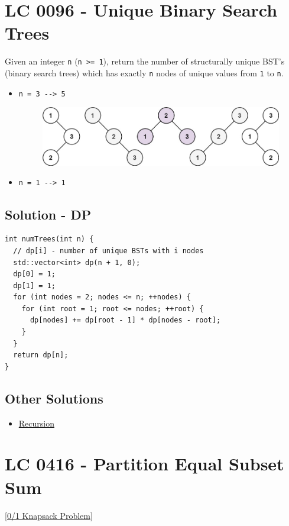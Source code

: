 \section{LC 0096 - Unique Binary Search Trees}
Given an integer {\colorbox{CodeBackground}{\lstinline|n|}} ({\colorbox{CodeBackground}{\lstinline|n >= 1|}}), return the number of structurally unique BST's (binary search trees) which has exactly {\colorbox{CodeBackground}{\lstinline|n|}} nodes of unique values from {\colorbox{CodeBackground}{\lstinline|1|}} to {\colorbox{CodeBackground}{\lstinline|n|}}.

\begin{itemize}
\item {\colorbox{CodeBackground}{\lstinline|n = 3 --> 5|}}
\begin{figure}[H]
\centering
\includegraphics[width=0.65\linewidth]{images/lc0096_eg}
\end{figure}
\item {\colorbox{CodeBackground}{\lstinline|n = 1 --> 1|}}
\end{itemize}

\subsection*{Solution - DP}\label{solution:lc0096_dp}
\begin{lstlisting}
int numTrees(int n) {
  // dp[i] - number of unique BSTs with i nodes
  std::vector<int> dp(n + 1, 0);
  dp[0] = 1;
  dp[1] = 1;
  for (int nodes = 2; nodes <= n; ++nodes) {
    for (int root = 1; root <= nodes; ++root) {
      dp[nodes] += dp[root - 1] * dp[nodes - root];
    }
  }
  return dp[n];
}
\end{lstlisting}

\subsection*{Other Solutions}
\begin{itemize}
\item \hyperref[solution:lc0096_recursion]{Recursion}
\end{itemize}

\section{LC 0416 - Partition Equal Subset Sum}\label{lc0416}
{\hyperref[subsubsec:01_knapsack_oj_problems]{[0/1 Knapsack Problem]}} \\

